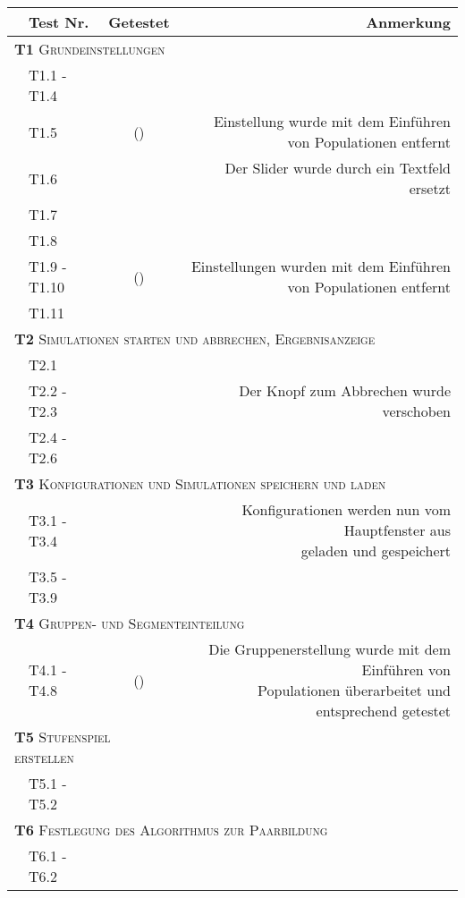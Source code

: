 \documentclass[parskip=full,11pt,openany]{scrreprt}
\newcommand{\cmark}{\ding{51}}%
\newcommand{\xmark}{\ding{55}}%
\begin{document}
\begin{table}
	\centering
	\begin{tabular}{@{}ll|c|r@{}}
		\toprule
		&\textbf{Test Nr.} & \textbf{Getestet} &\textbf{Anmerkung} \\ 
		\midrule
		\multicolumn{3}{l|}{\small \textsc{\textbf{T1} Grundeinstellungen}} \\ 
		&T1.1 - T1.4 & \cmark & \\
		&T1.5 & (\xmark) & \makecell{Einstellung wurde mit dem Einführen\\ von Populationen entfernt}\\
		&T1.6 & \cmark & Der Slider wurde durch ein Textfeld ersetzt\\
		&T1.7 & \cmark & \\
		&T1.8 & \cmark & \\
		&T1.9 - T1.10 & (\xmark) & \makecell{Einstellungen wurden mit dem Einführen\\ von Populationen entfernt}\\
		&T1.11 & \cmark & \\ 
		\multicolumn{4}{l}{\small \textsc{\textbf{T2} Simulationen starten und abbrechen, Ergebnisanzeige}}\\ 
		&T2.1 & \cmark & \\
		&T2.2 - T2.3 & \cmark & Der Knopf zum Abbrechen wurde verschoben\\
		&T2.4 - T2.6 & \cmark & \\
		\multicolumn{4}{l}{\small \textsc{\textbf{T3} Konfigurationen und Simulationen speichern und laden}}\\ 	
		&T3.1 - T3.4 & \cmark & \makecell{Konfigurationen werden nun vom Hauptfenster aus\\ geladen und gespeichert}\\
		&T3.5 - T3.9 & \cmark & \\
		\multicolumn{4}{l}{\small \textsc{\textbf{T4} Gruppen- und Segmenteinteilung}}\\ 
		&T4.1 - T4.8 & (\cmark) & \makecell{Die Gruppenerstellung wurde mit dem Einführen von\\ Populationen überarbeitet und entsprechend getestet} \\
		\multicolumn{3}{l|}{\small \textsc{\textbf{T5} Stufenspiel erstellen}}\\ 
		&T5.1 - T5.2 & \cmark & \\
		\multicolumn{4}{l}{\small \textsc{\textbf{T6} Festlegung des Algorithmus zur Paarbildung}}\\ 
		&T6.1 - T6.2 & \cmark & \\

\end{tabular}
\end{table}
\end{document}
